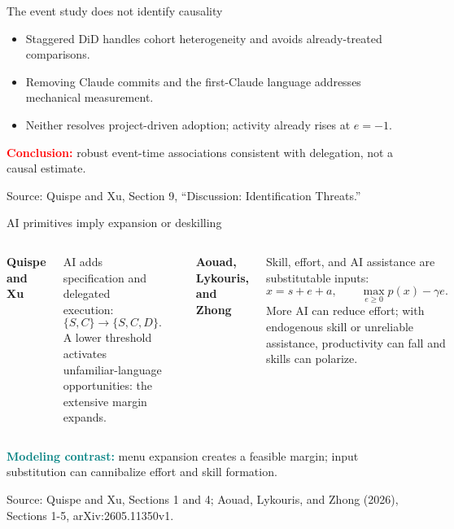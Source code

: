 \documentclass[aspectratio=169,11pt]{beamer}
\newcommand{\source}[1]{%
  \vfill\par\begingroup\color{gray!75!black}\fontsize{7}{8}\selectfont
  Source: #1\par\endgroup}
\newcommand{\key}[1]{\textcolor{Teal}{\textbf{#1}}}
\newcommand{\warn}[1]{\textcolor{Red}{\textbf{#1}}}
\begin{document}
\begin{frame}{The event study does not identify causality}
  \centering
  \vspace{0.22cm}
  \small
  \begin{itemize}\setlength\itemsep{0.12cm}
    \item Staggered DiD handles cohort heterogeneity and avoids already-treated comparisons.
    \item Removing Claude commits and the first-Claude language addresses mechanical measurement.
    \item Neither resolves project-driven adoption; activity already rises at \(e=-1\).
  \end{itemize}
  \warn{Conclusion:} robust event-time associations consistent with delegation, not a causal estimate.
  \source{Quispe and Xu, Section 9, “Discussion: Identification Threats.”}
\end{frame}

\begin{frame}{AI primitives imply expansion or deskilling}
  \begin{columns}[T,onlytextwidth]
      {\color{Teal}\large\textbf{Quispe and Xu}}\par\smallskip
      AI adds specification and delegated execution:
      \[
        \{S,C\}\longrightarrow\{S,C,D\}.
      \]
      A lower threshold activates unfamiliar-language opportunities: the extensive margin expands.

      \centering\color{gray!45}\rule{0.4pt}{5.0cm}

      {\color{Orange}\large\textbf{Aouad, Lykouris, and Zhong}}\par\smallskip
      Skill, effort, and AI assistance are substitutable inputs:
      \[
        x=s+e+a,\qquad \max_{e\ge0}p(x)-\gamma e.
      \]
      More AI can reduce effort; with endogenous skill or unreliable assistance, productivity can fall and skills can polarize.
  \end{columns}
  \vspace{0.12cm}
  \small\key{Modeling contrast:} menu expansion creates a feasible margin; input substitution can cannibalize effort and skill formation.
  \source{Quispe and Xu, Sections 1 and 4; Aouad, Lykouris, and Zhong (2026), Sections 1-5, arXiv:2605.11350v1.}
\end{frame}
\end{document}
